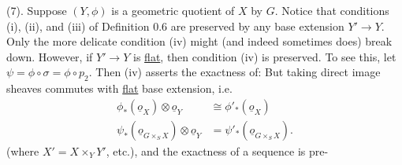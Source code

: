 (7). Suppose $(Y,\phi)$ is a geometric quotient of $X$ by $G$. Notice that conditions (i), (ii), and (iii) of Definition 0.6 are preserved by any base extension $Y'\to Y$. Only the more delicate condition (iv) might (and indeed sometimes does) break down. However, if $Y'\longrightarrow Y$ is \uline{flat}, then condition (iv) is preserved. To see this, let $\psi=\phi\circ\sigma=\phi\circ p_2$. Then (iv) asserts the exactness of:
But taking direct image sheaves commutes with \uline{flat} base extension, i.e.
\[
\begin{aligned}
\phi_*(\underline o_X)\otimes\underline o_Y&\cong\phi'_*(\underline o_X)\\
\psi_*(\underline o_{G\times_S X})\otimes\underline o_Y&=\psi'_*(\underline o_{G\times_S X}).
\end{aligned}
\]
(where $X'=X\times_Y Y'$, etc.), and the exactness of a sequence is pre-


